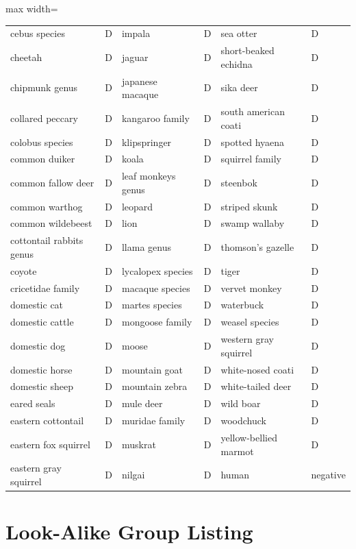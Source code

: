 \begin{table}[p]
\begin{adjustbox}{max width=\textwidth}
\begin{tabular}{@{}llllll@{}}
    cebus species & D & impala & D & sea otter & D \\
    cheetah & D & jaguar & D & short-beaked echidna & D \\
    chipmunk genus & D & japanese macaque & D & sika deer & D \\
    collared peccary & D & kangaroo family & D & south american coati & D \\
    colobus species & D & klipspringer & D & spotted hyaena & D \\
    common duiker & D & koala & D & squirrel family & D \\
    common fallow deer & D & leaf monkeys genus & D & steenbok & D \\
    common warthog & D & leopard & D & striped skunk & D \\
    common wildebeest & D & lion & D & swamp wallaby & D \\
    cottontail rabbits genus & D & llama genus & D & thomson's gazelle & D \\
    coyote & D & lycalopex species & D & tiger & D \\
    cricetidae family & D & macaque species & D & vervet monkey & D \\
    domestic cat & D & martes species & D & waterbuck & D \\
    domestic cattle & D & mongoose family & D & weasel species & D \\
    domestic dog & D & moose & D & western gray squirrel & D \\
    domestic horse & D & mountain goat & D & white-nosed coati & D \\
    domestic sheep & D & mountain zebra & D & white-tailed deer & D \\
    eared seals & D & mule deer & D & wild boar & D \\
    eastern cottontail & D & muridae family & D & woodchuck & D \\
    eastern fox squirrel & D & muskrat & D & yellow-bellied marmot & D \\
    eastern gray squirrel & D & nilgai & D & human & negative \\
    \bottomrule
\end{tabular}
\end{adjustbox}
\end{table}

\section{Look-Alike Group Listing}\label{sec:appendix_lookalike_groups}

